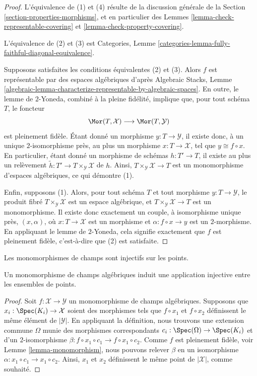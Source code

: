 \begin{proof}
L'équivalence de (1) et (4) résulte de la discussion générale de la
Section \ref{section-properties-morphisms},
et en particulier des
Lemmes \ref{lemma-check-representable-covering} et
\ref{lemma-check-property-covering}.

\medskip\noindent
L'équivalence de (2) et (3) est
Categories, Lemme \ref{categories-lemma-fully-faithful-diagonal-equivalence}.

\medskip\noindent
Supposons satisfaites les conditions équivalentes (2) et (3). Alors $f$ est représentable
par des espaces algébriques d'après
Algebraic Stacks,
Lemme \ref{algebraic-lemma-characterize-representable-by-algebraic-spaces}.
En outre, le lemme de $2$-Yoneda, combiné à la pleine fidélité,
implique que, pour tout schéma $T$, le foncteur
$$
\Mor(T, \mathcal{X})
\longrightarrow
\Mor(T, \mathcal{Y})
$$
est pleinement fidèle. Étant donné un morphisme $y : T \to \mathcal{Y}$, il existe donc,
à un unique $2$-isomorphisme près, au plus un morphisme $x : T \to \mathcal{X}$,
tel que $y \cong f \circ x$. En particulier, étant donné un morphisme de schémas
$h : T' \to T$, il existe au plus un relèvement
$\tilde h : T' \to T \times_\mathcal{Y} \mathcal{X}$ de $h$.
Ainsi, $T \times_\mathcal{Y} \mathcal{X} \to T$ est un monomorphisme
d'espaces algébriques, ce qui démontre (1).

\medskip\noindent
Enfin, supposons (1). Alors, pour tout schéma $T$ et tout morphisme
$y : T \to \mathcal{Y}$, le produit fibré $T \times_\mathcal{Y} \mathcal{X}$
est un espace algébrique, et $T \times_\mathcal{Y} \mathcal{X} \to T$
est un monomorphisme. Il existe donc exactement un couple, à isomorphisme unique près,
$(x, \alpha)$, où $x : T \to \mathcal{X}$ est un morphisme
et $\alpha : f \circ x \to y$ est un $2$-morphisme. En appliquant
le lemme de $2$-Yoneda, cela signifie exactement que $f$ est pleinement fidèle, c'est-à-dire
que (2) est satisfaite.
\end{proof}

\begin{lemma}
\label{lemma-monomorphism-injective-points}
\begin{slogan}
Les monomorphismes de champs sont injectifs sur les points.
\end{slogan}
Un monomorphisme de champs algébriques induit une application injective entre les
ensembles de points.
\end{lemma}

\begin{proof}
Soit $f : \mathcal{X} \to \mathcal{Y}$ un monomorphisme de champs algébriques.
Supposons que $x_i : \Spec(K_i) \to \mathcal{X}$ soient des morphismes tels que
$f \circ x_1$ et $f \circ x_2$ définissent le même élément de $|\mathcal{Y}|$.
En appliquant la définition, nous trouvons une extension commune $\Omega$ munie des
morphismes correspondants $c_i : \Spec(\Omega) \to \Spec(K_i)$ et d'un
$2$-isomorphisme $\beta : f \circ x_1 \circ c_1 \to f \circ x_1 \circ c_2$.
Comme $f$ est pleinement fidèle, voir
Lemme \ref{lemma-monomorphism},
nous pouvons relever $\beta$ en un isomorphisme
$\alpha : x_1 \circ c_1 \to x_1 \circ c_2$.
Ainsi, $x_1$ et $x_2$ définissent le même point de $|\mathcal{X}|$,
comme souhaité.
\end{proof}

